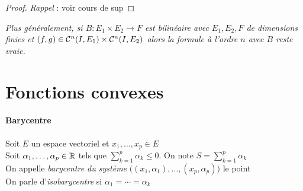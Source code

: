      \medskip
    
    
    \begin{proof} 
    \emph{Rappel} : voir cours de sup 
    \end{proof} \medskip
    
    \emph{Plus généralement, si $B : E_1\times E_2 \rightarrow F$ est bilinéaire avec $E_1,E_2,F$ de dimensions finies et $(f,g) \in {\mathcal{C}}^n(I,E_1)\times{\mathcal{C}}^n(I,E_2)$ alors la formule à l'ordre $n$ avec $B$ reste vraie.} \\
    
    
     \medskip
    
    
\section{Fonctions convexes}
    
    \vspace{-25pt}
    \traitd
    \paragraph{Barycentre}
        Soit $E$ un espace vectoriel et $x_1,\dots ,x_p \in E$ \\
        Soit $\alpha_1 ,\dots ,\alpha_p\in {\mathbb{R}}$ tels que $\sum_{k=1}^p \alpha_k \leqslant 0$. On note $S = \sum_{k=1}^p \alpha_k$\\
        On appelle \emph{barycentre du système} $\big( (x_1,\alpha_1) ,\dots ,(x_p,\alpha_p) \big)$ le point \\
        On parle d'\emph{isobarycentre} si $\alpha_1 = \cdots = \alpha_k$ 
	\trait 
	
